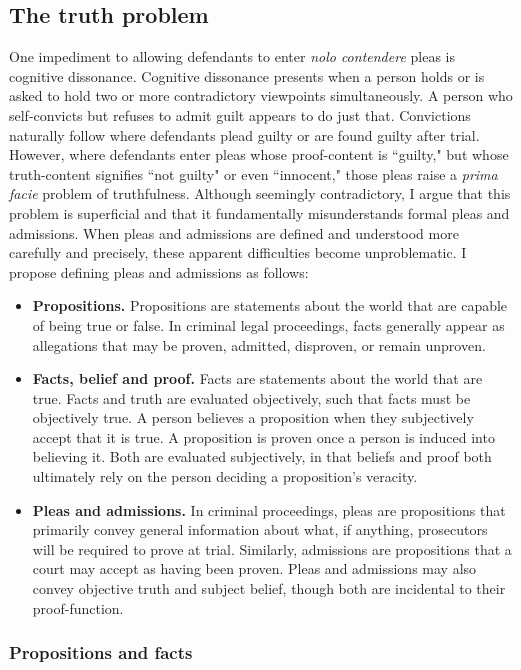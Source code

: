 \subsection{The truth problem}

One impediment to allowing defendants to enter \textit{nolo contendere} pleas is cognitive dissonance. Cognitive dissonance presents when a person holds or is asked to hold two or more contradictory viewpoints simultaneously. A person who self-convicts but refuses to admit guilt appears to do just that. Convictions naturally follow where defendants plead guilty or are found guilty after trial. However, where defendants enter pleas whose proof-content is ``guilty," but whose truth-content signifies ``not guilty" or even ``innocent," those pleas raise a \textit{prima facie} problem of truthfulness. Although seemingly contradictory, I argue that this problem is superficial and that it fundamentally misunderstands formal pleas and admissions. When pleas and admissions are defined and understood more carefully and precisely, these apparent difficulties become unproblematic. I propose defining pleas and admissions as follows:

\begin{itemize}
    \item \textbf{Propositions.} Propositions are statements about the world that are capable of being true or false. In criminal legal proceedings, facts generally appear as allegations that may be proven, admitted, disproven, or remain unproven.
    \item \textbf{Facts, belief and proof.} Facts are statements about the world that are true. Facts and truth are evaluated objectively, such that facts must be objectively true. A person believes a proposition when they subjectively accept that it is true. A proposition is proven once a person is induced into believing it. Both are evaluated subjectively, in that beliefs and proof both ultimately rely on the person deciding a proposition's veracity.
    \item \textbf{Pleas and admissions.} In criminal proceedings, pleas are propositions that primarily convey general information about what, if anything, prosecutors will be required to prove at trial. Similarly, admissions are propositions that a court may accept as having been proven. Pleas and admissions may also convey objective truth and subject belief, though both are incidental to their proof-function.
\end{itemize}

\subsubsection{Propositions and facts}

